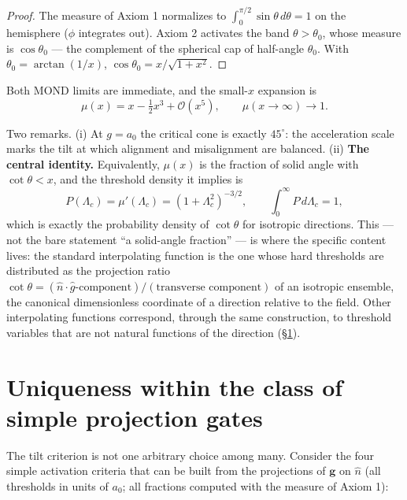 \documentclass[11pt]{article}
\theoremstyle{plain}
\begin{document}
\begin{proof}
The measure of Axiom 1 normalizes to $\int_0^{\pi/2}\sin\theta\,d\theta=1$ on the hemisphere ($\phi$ integrates out). Axiom 2 activates the band $\theta>\theta_0$, whose measure is $\cos\theta_0$ --- the complement of the spherical cap of half-angle $\theta_0$. With $\theta_0=\arctan(1/x)$, $\cos\theta_0 = x/\sqrt{1+x^2}$.
\end{proof}

Both MOND limits are immediate, and the small-$x$ expansion is
\begin{equation*}\tag{4}\label{eq:4}
\mu(x) = x - \tfrac12 x^3 + \mathcal{O}(x^5), \qquad \mu(x\to\infty)\to 1.
\end{equation*}

Two remarks. (i) At $g=a_0$ the critical cone is exactly $45^\circ$: the acceleration scale marks the tilt at which alignment and misalignment are balanced. (ii) \textbf{The central identity.} Equivalently, $\mu(x)$ is the fraction of solid angle with $\cot\theta < x$, and the threshold density it implies is
\begin{equation*}\tag{5}\label{eq:5}
P(\Lambda_c) = \mu'(\Lambda_c) = (1+\Lambda_c^2)^{-3/2}, \qquad \int_0^\infty P\,d\Lambda_c = 1,
\end{equation*}
which is exactly the probability density of $\cot\theta$ for isotropic directions. This --- not the bare statement ``a solid-angle fraction'' --- is where the specific content lives: the standard interpolating function is the one whose hard thresholds are distributed as the projection ratio $\cot\theta = (\hat n\cdot\hat g\text{-component})/(\text{transverse component})$ of an isotropic ensemble, the canonical dimensionless coordinate of a direction relative to the field. Other interpolating functions correspond, through the same construction, to threshold variables that are not natural functions of the direction (\S\ref{sec:uniqueness}).

\section{Uniqueness within the class of simple projection gates}\label{sec:uniqueness}

The tilt criterion is not one arbitrary choice among many. Consider the four simple activation criteria that can be built from the projections of $\mathbf{g}$ on $\hat n$ (all thresholds in units of $a_0$; all fractions computed with the measure of Axiom 1):
\end{document}
